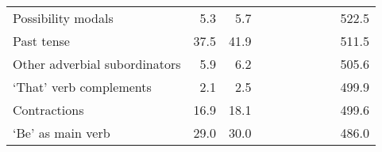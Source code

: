 \begin{table}[!t]
\begin{tabular*}{\linewidth}{@{\extracolsep{\fill}}lrrrrrrrrr}
Possibility modals & 5.3 & 5.7 & {\cellcolor[HTML]{92C5DE}{\textcolor[HTML]{000000}{144\%}}} & {\cellcolor[HTML]{F7F7F7}{\textcolor[HTML]{000000}{104\%}}} & {\cellcolor[HTML]{F7F7F7}{\textcolor[HTML]{000000}{111\%}}} & {\cellcolor[HTML]{D1E5F0}{\textcolor[HTML]{000000}{116\%}}} & {\cellcolor[HTML]{F7F7F7}{\textcolor[HTML]{000000}{99\%}}} & {\cellcolor[HTML]{F7F7F7}{\textcolor[HTML]{000000}{99\%}}} & 522.5 \\ 
Past tense & 37.5 & 41.9 & {\cellcolor[HTML]{FDDBC7}{\textcolor[HTML]{000000}{77\%}}} & {\cellcolor[HTML]{FDDBC7}{\textcolor[HTML]{000000}{83\%}}} & {\cellcolor[HTML]{F7F7F7}{\textcolor[HTML]{000000}{91\%}}} & {\cellcolor[HTML]{FDDBC7}{\textcolor[HTML]{000000}{83\%}}} & {\cellcolor[HTML]{D1E5F0}{\textcolor[HTML]{000000}{115\%}}} & {\cellcolor[HTML]{F7F7F7}{\textcolor[HTML]{000000}{111\%}}} & 511.5 \\ 
Other adverbial subordinators & 5.9 & 6.2 & {\cellcolor[HTML]{92C5DE}{\textcolor[HTML]{000000}{136\%}}} & {\cellcolor[HTML]{D1E5F0}{\textcolor[HTML]{000000}{118\%}}} & {\cellcolor[HTML]{D1E5F0}{\textcolor[HTML]{000000}{114\%}}} & {\cellcolor[HTML]{F7F7F7}{\textcolor[HTML]{000000}{107\%}}} & {\cellcolor[HTML]{FDDBC7}{\textcolor[HTML]{000000}{82\%}}} & {\cellcolor[HTML]{FDDBC7}{\textcolor[HTML]{000000}{89\%}}} & 505.6 \\ 
‘That’ verb complements & 2.1 & 2.5 & {\cellcolor[HTML]{F4A582}{\textcolor[HTML]{000000}{70\%}}} & {\cellcolor[HTML]{F4A582}{\textcolor[HTML]{000000}{55\%}}} & {\cellcolor[HTML]{92C5DE}{\textcolor[HTML]{000000}{144\%}}} & {\cellcolor[HTML]{D1E5F0}{\textcolor[HTML]{000000}{114\%}}} & {\cellcolor[HTML]{92C5DE}{\textcolor[HTML]{000000}{159\%}}} & {\cellcolor[HTML]{92C5DE}{\textcolor[HTML]{000000}{147\%}}} & 499.9 \\ 
Contractions & 16.9 & 18.1 & {\cellcolor[HTML]{F4A582}{\textcolor[HTML]{000000}{63\%}}} & {\cellcolor[HTML]{F4A582}{\textcolor[HTML]{000000}{60\%}}} & {\cellcolor[HTML]{92C5DE}{\textcolor[HTML]{000000}{141\%}}} & {\cellcolor[HTML]{92C5DE}{\textcolor[HTML]{000000}{139\%}}} & {\cellcolor[HTML]{92C5DE}{\textcolor[HTML]{000000}{142\%}}} & {\cellcolor[HTML]{D1E5F0}{\textcolor[HTML]{000000}{129\%}}} & 499.6 \\ 
‘Be’ as main verb & 29.0 & 30.0 & {\cellcolor[HTML]{F4A582}{\textcolor[HTML]{000000}{61\%}}} & {\cellcolor[HTML]{F4A582}{\textcolor[HTML]{000000}{63\%}}} & {\cellcolor[HTML]{F7F7F7}{\textcolor[HTML]{000000}{107\%}}} & {\cellcolor[HTML]{F7F7F7}{\textcolor[HTML]{000000}{100\%}}} & {\cellcolor[HTML]{F7F7F7}{\textcolor[HTML]{000000}{108\%}}} & {\cellcolor[HTML]{F7F7F7}{\textcolor[HTML]{000000}{101\%}}} & 486.0 \\ 

\end{tabular*}
\end{table}
